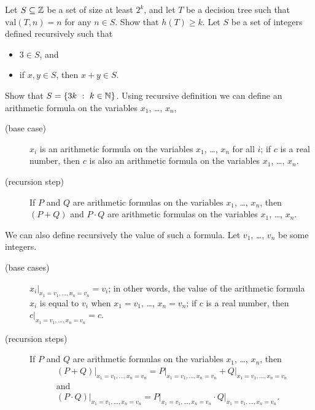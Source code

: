 \begin{chapterendexercises}
  \exercise[recommended] Let $S \subseteq {\mathbb{Z}}$ be a set of size at least $2^k$,
    and let $T$ be a decision tree such that $\mathrm{val}(T, n) = n$ for any $n
    \in S$. Show that $h(T) \ge k$.
  \exercise[recommended] Let $S$ be a set of integers defined recursively such
    that
    \begin{itemize}
      \item $3 \in S$, and 
      \item if $x, y \in S$, then $x + y \in S$.
    \end{itemize}
    Show that $S = \set[k \in \N]{3k}$.
  \exercise[recommended]
    Using recursive definition we can define an arithmetic formula on the
    variables $x_1$, \dots, $x_n$,
    \begin{description}
      \item [(base case)] $x_i$ is an arithmetic formula on the variables $x_1$,
        \dots, $x_n$ for all $i$; if $c$ is a real number, then $c$ is also an
        arithmetic formula on the variables $x_1$, \dots, $x_n$.
      \item[(recursion step)] If $P$ and $Q$ are arithmetic formulas on the
        variables $x_1$, \dots, $x_n$, then $(P + Q)$ and $P \cdot Q$ are
        arithmetic formulas on the variables $x_1$, \dots, $x_n$.
    \end{description}

    We can also define recursively the value of such a formula.
    Let $v_1$, \dots, $v_n$ be some integers.
    \begin{description}
      \item[(base cases)] $x_i\big\rvert_{x_1 = v_1, \dots, x_n = v_n} = v_i$;
        in other words, the value of the arithmetic formula $x_i$ is equal to
        $v_i$ when $x_1 = v_1$, \dots, $x_n = v_n$; if $c$ is a real number,
        then $c\rvert_{x_1 = v_1, \dots, x_n = v_n} = c$.
      \item[(recursion steps)] If $P$ and $Q$ are arithmetic formulas on the
        variables $x_1$, \dots, $x_n$, then
        \begin{gather*}
          (P + Q)\big\rvert_{x_1 = v_1, \dots, x_n = v_n} =
          P\big\rvert_{x_1 = v_1, \dots, x_n = v_n} +
          Q\big\rvert_{x_1 = v_1, \dots, x_n = v_n} \\        
        \text{and} \\        
         (P \cdot Q)\big\rvert_{x_1 = v_1, \dots, x_n = v_n} =
         P\big\rvert_{x_1 = v_1, \dots, x_n = v_n} \cdot
         Q\big\rvert_{x_1 = v_1, \dots, x_n = v_n}.
        \end{gather*}
    \end{description}


\end{chapterendexercises}
